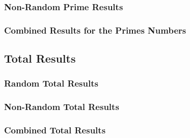 \subsubsection{Non-Random Prime Results}


\subsubsection{Combined Results for the Primes Numbers} 


\subsection{Total Results}
\subsubsection{Random Total Results}


\subsubsection{Non-Random Total Results}


\subsubsection{Combined Total Results}

